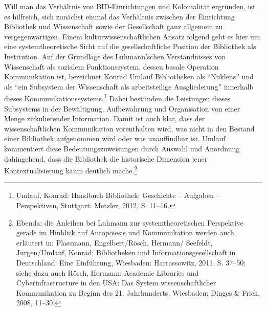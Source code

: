 \documentclass[a4paper,
fontsize=11pt,
oneside,
numbers=noperiodatend,
parskip=half-,
bibliography=totoc,
final
]{scrartcl}
\begin{document}
Will man das Verhältnis von BID-Einrichtungen und Kolonialität
ergründen, ist es hilfreich, sich zunächst einmal das Verhältnis
zwischen der Einrichtung Bibliothek und Wissenschaft sowie der
Gesellschaft ganz allgemein zu vergegenwärtigen. Einem
kulturwissenschaftlichen Ansatz folgend geht es hier um eine
systemtheoretische Sicht auf die gesellschaftliche Position der
Bibliothek als Institution. Auf der Grundlage des Luhmann'schen
Verständnisses von Wissenschaft als sozialem Funktionssystem, dessen
basale Operation Kommunikation ist, bezeichnet Konrad Umlauf
Bibliotheken als \enquote{Nukleus} und als \enquote{ein Subsystem der
Wissenschaft als arbeitsteilige Ausgliederung} innerhalb dieses
Kommunikationssystems.\footnote{Umlauf, Konrad: Handbuch Bibliothek:
  Geschichte -- Aufgaben -- Perspektiven, Stuttgart: Metzler, 2012, S.
  11--16.} Dabei bestünden die Leistungen dieses Subsystems in der
Bewältigung, Aufbewahrung und Organisation von einer Menge
zirkulierender Information. Damit ist auch klar, dass der
wissenschaftlichen Kommunikation vorenthalten wird, was nicht in den
Bestand einer Bibliothek aufgenommen wird oder was unauffindbar ist.
Umlauf kommentiert diese Bedeutungszuweisungen durch Auswahl und
Anordnung dahingehend, dass die Bibliothek die historische Dimension
jener Kontextualisierung kaum deutlich mache.\footnote{Ebenda; die
  Anleihen bei Luhmann zur systemtheoretischen Perspektive gerade im
  Hinblick auf Autopoiesis und Kommunikation werden auch erläutert in:
  Plassmann, Engelbert/Rösch, Hermann/ Seefeldt, Jürgen/Umlauf, Konrad:
  Bibliotheken und Informationsgesellschaft in Deutschland: Eine
  Einführung, Wiesbaden: Harrassowitz, 2011, S. 37--50; siehe dazu auch
  Rösch, Hermann: Academic Libraries und Cyberinfrastructure in den USA:
  Das System wissenschaftlicher Kommunikation zu Beginn des 21.
  Jahrhunderts, Wiesbaden: Dinges \& Frick, 2008, 11--30.}
\end{document}
